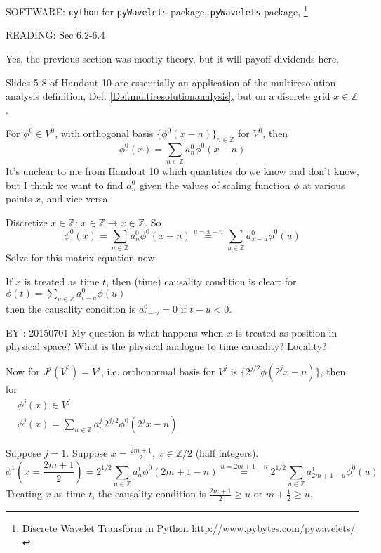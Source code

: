 \documentclass[twoside]{amsart}
\theoremstyle{plain}
\theoremstyle{definition}
\theoremstyle{remark}
\numberwithin{equation}{section}
\begin{document}
SOFTWARE: \verb|cython| for \verb|pyWavelets| package, \verb|pyWavelets| package, \footnote{Discrete Wavelet Transform in Python \url{http://www.pybytes.com/pywavelets/}}

READING: Sec 6.2-6.4 \cite{GStrangTNguyen1996}

Yes, the previous section was mostly theory, but it will payoff dividends here.  

Slides 5-8 of Handout 10 \cite{GStrangKAmaratunga2003} are essentially an application of the multiresolution analysis definition, Def. \ref{Def:multiresolutionanalysis}, but on a discrete grid $x \in \mathbb{Z}$.  

For $\phi^0 \in V^0$, with orthogonal basis $\lbrace \phi^0(x-n) \rbrace_{n\in \mathbb{Z}}$ for $V^0$, then
\[
\phi^0(x) = \sum_{n\in \mathbb{Z} } a_n^0 \phi^0(x-n)
\]
It's unclear to me from Handout 10 \cite{GStrangKAmaratunga2003} which quantities do we know and don't know, but I think we want to find $a_n^0$ given the values of scaling function $\phi$ at various points $x$, and vice versa.  

Discretize $x\in \mathbb{Z}$: $x \in \mathbb{Z} \to x\in \mathbb{Z}$.  So
\[
\phi^0(x) = \sum_{n \in \mathbb{Z}} a_n^0 \phi^0(x-n) \overset{u = x-n}{=} \sum_{u\in \mathbb{Z}} a^0_{x-u} \phi^0(u)
\]
Solve for this matrix equation now.  

If $x$ is treated as time $t$, then (time) causality condition is clear: for \\
$\phi(t)= \sum_{u\in \mathbb{Z}} a_{t-u}^0 \phi(u)$ \\
then the causality condition is $a^0_{t-u} = 0 $ if $t-u < 0$.  

EY : 20150701 My question is what happens when $x$ is treated as position in physical space? What is the physical analogue to time causality?  Locality? 

Now for $J^j(V^0) = V^j$, i.e. orthonormal basis for $V^j$ is $\lbrace 2^{j/2}\phi(2^jx - n) \rbrace$, then for \\
$\begin{aligned} 
  & \phi^j(x) \in V^j \\
  & \phi^j(x) = \sum_{n\in \mathbb{Z}} a_n^j2^{j/2} \phi^0(2^jx- n) \end{aligned}$

Suppose $j=1$.  Suppose $x = \frac{2m+1}{2}$, $x\in \mathbb{Z}/2$ (half integers).  
\[
\phi^1(x=\frac{2m+1}{2} ) = 2^{1/2} \sum_{n\in \mathbb{Z}} a_n^1 \phi^0(2m+1-n) \overset{u = 2m+1 -n }{=} 2^{1/2} \sum_{u \in \mathbb{Z}} a^1_{2m+1-u} \phi^0(u)
\]
Treating $x$ as time $t$, the causality condition is $\frac{2m+1}{2} \geq u$ or $m+\frac{1}{2} \geq u$.  
\end{document}
